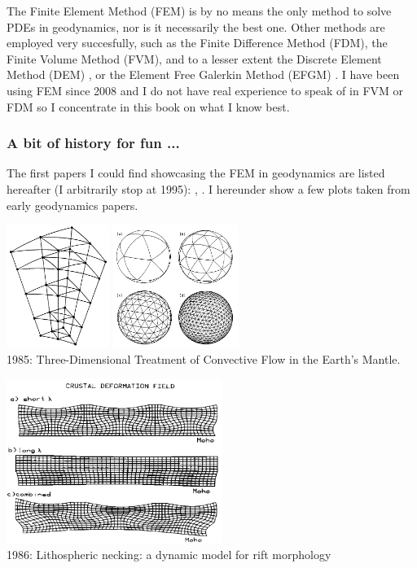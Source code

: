 The Finite Element Method (FEM) is by no means the only method 
to solve PDEs in geodynamics, nor is it necessarily the best one.
Other methods are employed very succesfully, such as the Finite Difference 
Method (FDM), the Finite Volume Method (FVM), and to a lesser extent
the Discrete Element Method (DEM) \cite{tasy05,egho07,egsc07,funi14}, 
or the Element Free Galerkin Method (EFGM) \cite{hans03}.
I have been using FEM since 2008 and I do not have real 
experience to speak of in FVM or FDM so I concentrate in this book 
on what I know best. 

\subsubsection{A bit of history for fun ... }

The first papers I could find showcasing the FEM in geodynamics are listed hereafter
(I arbitrarily stop at 1995):
\cite{gart78}, 
\cite{anbr80}\cite{mera80}
\cite{engl82}
\cite{thar85}
\cite{enho86}\cite{mofr86}
\cite{zupa86}
\cite{boww89}
\cite{brau94}
\cite{brbe95}.
I hereunder show a few plots taken from early geodynamics papers.

\begin{center}
\includegraphics[height=4cm]{images/history/baum85a}
\includegraphics[height=4cm]{images/history/baum85b}\\
{\small 1985: Three-Dimensional Treatment of Convective Flow in the Earth's Mantle.
\cite{baum85}}
\end{center}

\begin{center}
\includegraphics[width=7cm]{images/history/zupf86}\\
{\small 1986: Lithospheric necking: a dynamic model for rift morphology \cite{zupf86}}
\end{center}

